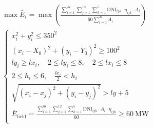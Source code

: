 \documentclass[../main.tex]{subfiles}
\begin{document}
  \begin{align}\label{2.9}
\begin{array}{c}
	\max \bar{E}_i = \max\left(\frac{\sum_{i=1}^{M} \sum_{j=1}^{12} \sum_{k=1}^{5} \text{DNI}_{ijk} \cdot \eta_{ijk} \cdot A_i}{60 \sum_{i=1}^{M} A_i}\right)
 \\
	\left\{ \begin{array}{l}
    x_i^2 + y_i^2 \leq 350^2\\
	(x_i - X_0)^2 + (y_i - Y_0)^2 \geq 100^2\\
	ly_i \geq lx_{i}, \quad 2 \leq ly_i\leq 8, \quad 2 \leq lx_i \leq 8
\\
2 \leq h_i \leq 6, \quad \frac{lx_i}{2} < h_i\\
	\sqrt{(x_i - x_j)^2 + (y_i - y_j)^2} > ly + 5\\
	\bar{E}_{\text{field}} = \frac{\sum_{i=1}^{m} \sum_{j=1}^{12} \sum_{k=1}^{5} \text{DNI}_{ijk} \cdot A_i \cdot \eta_{ijk}}{60} \geq 60\ \text{MW}\\
\end{array} \right.\\
\end{array}
  \end{align}


  
\end{document}
